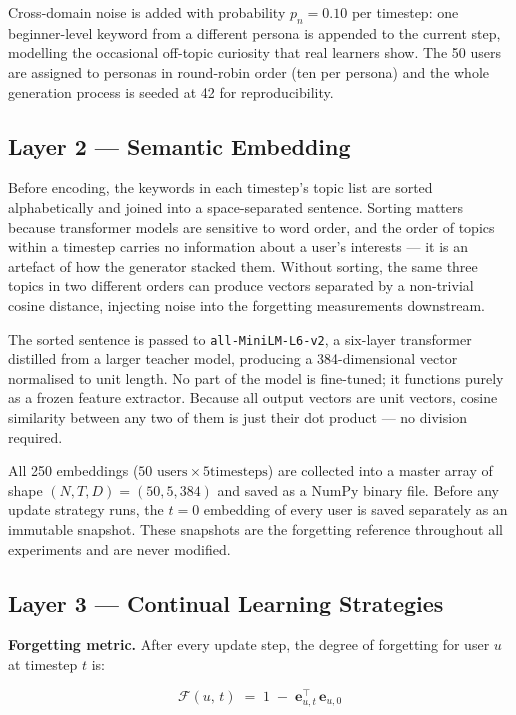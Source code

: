 \documentclass[conference]{IEEEtran}
\newcommand{\eb}{\mathbf{e}}
\newcommand{\Fc}{\mathcal{F}}
\begin{document}
Cross-domain noise is added with probability $p_n = 0.10$
per timestep: one beginner-level keyword from a different
persona is appended to the current step, modelling the
occasional off-topic curiosity that real learners show. The
50 users are assigned to personas in round-robin order (ten
per persona) and the whole generation process is seeded at
42 for reproducibility.

\subsection{Layer 2 --- Semantic Embedding}

Before encoding, the keywords in each timestep's topic list
are sorted alphabetically and joined into a
space-separated sentence. Sorting matters because transformer
models are sensitive to word order, and the order of topics
within a timestep carries no information about a user's
interests --- it is an artefact of how the generator stacked
them. Without sorting, the same three topics in two different
orders can produce vectors separated by a non-trivial cosine
distance, injecting noise into the forgetting measurements
downstream.

The sorted sentence is passed to
\texttt{all-MiniLM-L6-v2}, a six-layer transformer distilled
from a larger teacher model, producing a 384-dimensional
vector normalised to unit length. No part of the model is
fine-tuned; it functions purely as a frozen feature extractor.
Because all output vectors are unit vectors, cosine similarity
between any two of them is just their dot product --- no
division required.

All 250 embeddings ($50\text{ users} \times 5\text{
timesteps}$) are collected into a master array of shape
$(N, T, D) = (50, 5, 384)$ and saved as a NumPy binary file.
Before any update strategy runs, the $t{=}0$ embedding of
every user is saved separately as an immutable snapshot.
These snapshots are the forgetting reference throughout all
experiments and are never modified.

\subsection{Layer 3 --- Continual Learning Strategies}

\textbf{Forgetting metric.}\enspace
After every update step, the degree of forgetting for user
$u$ at timestep $t$ is:

\begin{equation}
  \Fc(u,\,t)
  \;=\;
  1 \;-\; \eb_{u,t}^{\top}\,\eb_{u,0}
  \label{eq:forgetting}
\end{equation}
\end{document}
